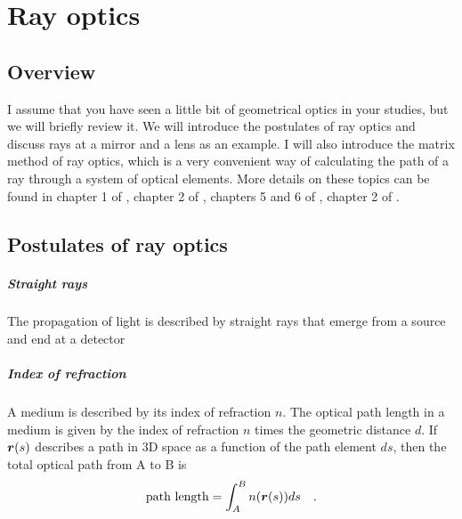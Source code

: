 \renewcommand{\lastmod}{October 11, 2023}
\renewcommand{\chapterauthors}{Markus Lippitz}

\chapter{Ray optics}






\section{Overview}

I assume that you have seen a little bit of geometrical optics in your studies, but we will briefly review it. We will introduce the postulates of ray optics and discuss rays at a mirror and a lens as an example. I will also introduce the matrix method of ray optics, which is a very convenient way of calculating the path of a ray through a system of optical elements. More details on these topics can be found in chapter 1 of \cite{SalehTeich1991}, chapter 2 of \cite{Hering_Martin_Optik},  chapters 5 and 6 of \cite{Hecht_Optics}, chapter 2 of \cite{Konijnenberg_Optics}.


\section{Postulates of ray optics}

\paragraph*{Straight rays}  The propagation of light is described by straight rays that emerge from a source and end at a detector

\paragraph*{Index of refraction} A medium is described by its index of refraction $n$. The optical path length in a medium is given by the index of refraction $n$ times the geometric distance $d$. If $\boldsymbol{r}(s)$ describes a path in 3D space as a function of the path element $ds$, then the total optical path from A to B is
\begin{equation}
    \text{path length} = \int_A^B n(\boldsymbol{r}(s)) ds \quad .
\end{equation}

